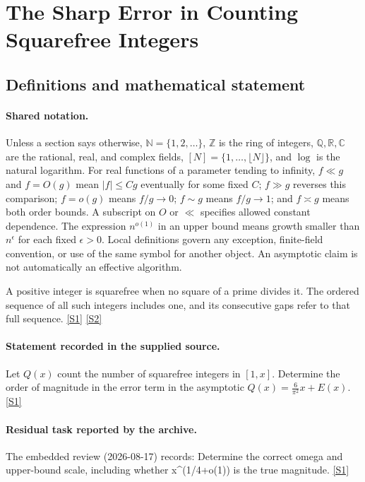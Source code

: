 \documentclass[11pt,a4paper]{article}
\newcommand{\N}{\mathbb{N}}
\newcommand{\Z}{\mathbb{Z}}
\newcommand{\Q}{\mathbb{Q}}
\newcommand{\R}{\mathbb{R}}
\newcommand{\C}{\mathbb{C}}
\newcommand{\sref}[2]{\hyperlink{source:#1:#2}{[S#2]}}
\begin{document}
\section{The Sharp Error in Counting Squarefree Integers}\label{statement}


\subsection{Definitions and mathematical statement}

\paragraph{Shared notation.}Unless a section says otherwise, $\N=\{1,2,\ldots\}$,
$\Z$ is the ring of integers, $\Q,\R,\C$ are the rational, real, and complex
fields, $[N]=\{1,\ldots,\lfloor N\rfloor\}$, and $\log$ is the natural
logarithm. For real functions of a parameter tending to infinity,
$f\ll g$ and $f=O(g)$ mean $|f|\leq Cg$ eventually for some fixed $C$;
$f\gg g$ reverses this comparison; $f=o(g)$ means $f/g\to0$;
$f\sim g$ means $f/g\to1$; and $f\asymp g$ means both order bounds.
A subscript on $O$ or $\ll$ specifies allowed constant dependence.
The expression $n^{o(1)}$ in an upper bound means growth smaller than
$n^\epsilon$ for each fixed $\epsilon>0$. Local definitions govern any
exception, finite-field convention, or use of the same symbol for another
object. An asymptotic claim is not automatically an effective algorithm.



A positive integer is squarefree when no square of a prime divides it. The ordered sequence of all such integers includes one, and its consecutive gaps refer to that full sequence. \sref{statement}{1} \sref{statement}{2}

\paragraph{Statement recorded in the supplied source.}
Let $Q(x)$ count the number of squarefree integers in $[1,x]$. Determine the order of magnitude in the error term in the asymptotic $ Q(x)=\frac{6}{\pi^2}x+E(x). $ \sref{statement}{1}

\paragraph{Residual task reported by the archive.}

The embedded review (2026-08-17) records: Determine the correct omega and upper-bound scale, including whether x\textasciicircum{}(1/4+o(1)) is the true magnitude. \sref{statement}{1}
\end{document}
